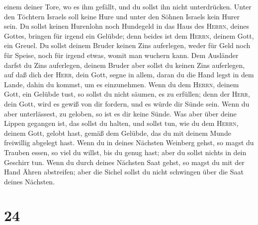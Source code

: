 einem deiner Tore, wo es ihm gefällt, und du sollst ihn nicht
unterdrücken.  Unter den Töchtern Israels soll keine Hure
und unter den Söhnen Israels kein Hurer sein.  Du sollst
keinen Hurenlohn noch Hundegeld in das Haus des \textsc{Herrn}, deines
Gottes, bringen für irgend ein Gelübde; denn beides ist dem
\textsc{Herrn}, deinem Gott, ein Greuel.  Du sollst
deinem Bruder keinen Zins auferlegen, weder für Geld noch für Speise,
noch für irgend etwas, womit man wuchern kann.  Dem
Ausländer darfst du Zins auferlegen, deinem Bruder aber sollst du keinen
Zins auferlegen, auf daß dich der \textsc{Herr}, dein Gott, segne in
allem, daran du die Hand legst in dem Lande, dahin du kommst, um es
einzunehmen.  Wenn du dem \textsc{Herrn}, deinem Gott,
ein Gelübde tust, so sollst du nicht säumen, es zu erfüllen; denn der
\textsc{Herr}, dein Gott, wird es gewiß von dir fordern, und es würde
dir Sünde sein.  Wenn du aber unterlässest, zu geloben,
so ist es dir keine Sünde.  Was aber über deine Lippen
gegangen ist, das sollst du halten, und sollst tun, wie du dem
\textsc{Herrn}, deinem Gott, gelobt hast, gemäß dem Gelübde, das du mit
deinem Munde freiwillig abgelegt hast.  Wenn du in deines
Nächsten Weinberg gehst, so magst du Trauben essen, so viel du willst,
bis du genug hast; aber du sollst nichts in dein Geschirr tun.
 Wenn du durch deines Nächsten Saat gehst, so magst du
mit der Hand Ähren abstreifen; aber die Sichel sollst du nicht schwingen
über die Saat deines Nächsten.

\hypertarget{section-23}{%
\section{24}\label{section-23}}

